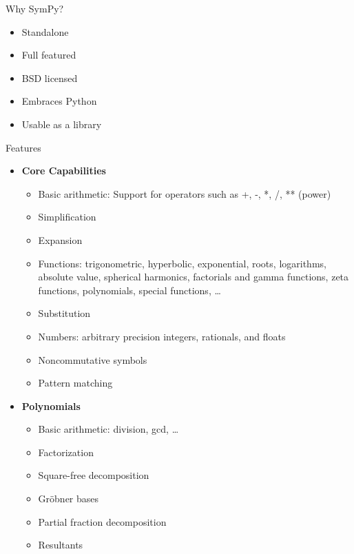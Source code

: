 \documentclass[xcolor=svgnames]{beamer}
\begin{document}
  \begin{frame}{Why SymPy?}
    \begin{block}{}
      \begin{itemize}
        \item Standalone
        \item Full featured
        \item BSD licensed
        \item Embraces Python
        \item Usable as a library
      \end{itemize}
    \end{block}
  \end{frame}

  \begin{frame}{Features}
    \begin{multicols}{2}
      \tiny
      \begin{itemize}
      \item \textbf{Core Capabilities}
        \begin{itemize}
          \tiny
        \item Basic arithmetic: Support for operators such as +, -, *, /, ** (power)
        \item Simplification
        \item Expansion
        \item Functions: trigonometric, hyperbolic, exponential, roots, logarithms,
          absolute value, spherical harmonics, factorials and gamma functions, zeta
          functions, polynomials, special functions, \ldots
        \item Substitution
        \item Numbers: arbitrary precision integers, rationals, and floats
        \item Noncommutative symbols
        \item Pattern matching
        \end{itemize}
      \item \textbf{Polynomials}
        \begin{itemize}
          \tiny
        \item Basic arithmetic: division, gcd, \ldots
        \item Factorization
        \item Square-free decomposition
        \item Gröbner bases
        \item Partial fraction decomposition
        \item Resultants

\end{itemize}
\end{itemize}
\end{multicols}
\end{frame}
\end{document}
